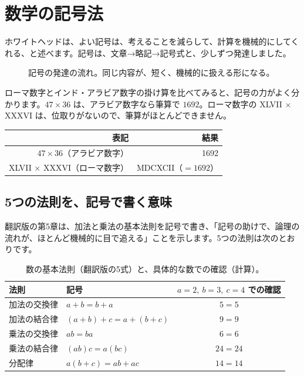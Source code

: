 \documentclass[a4paper,11pt,openany]{ltjsbook}
\begin{document}
\chapter{数学の記号法}

ホワイトヘッドは、よい記号は、考えることを減らして、計算を機械的にしてくれる、と述べます。記号は、文章→略記→記号式と、少しずつ発達しました。

\begin{figure}[htbp]
\centering
{}
\caption{記号の発達の流れ。同じ内容が、短く、機械的に扱える形になる。}
\end{figure}

ローマ数字とインド・アラビア数字の掛け算を比べてみると、記号の力がよく分かります。$47\times36$ は、アラビア数字なら筆算で $1692$。ローマ数字の XLVII $\times$ XXXVI は、位取りがないので、筆算がほとんどできません。

\begin{center}
\begin{tabular}{rr}
\toprule
表記 & 結果\\
\midrule
$47\times36$（アラビア数字） & 1692\\
XLVII $\times$ XXXVI（ローマ数字） & MDCXCII（$=1692$）\\
\bottomrule
\end{tabular}
\end{center}


\section{5つの法則を、記号で書く意味}

翻訳版の第5章は、加法と乗法の基本法則を記号で書き、「記号の助けで、論理の流れが、ほとんど機械的に目で追える」ことを示します。5つの法則は次のとおりです。

\begin{table}[htbp]
\centering
\begin{tabular}{llc}
\toprule
法則 & 記号 & $a=2,\ b=3,\ c=4$ での確認\\
\midrule
加法の交換律 & $a+b=b+a$ & $5=5$\\
加法の結合律 & $(a+b)+c=a+(b+c)$ & $9=9$\\
乗法の交換律 & $ab=ba$ & $6=6$\\
乗法の結合律 & $(ab)c=a(bc)$ & $24=24$\\
分配律 & $a(b+c)=ab+ac$ & $14=14$\\
\bottomrule
\end{tabular}
\caption{数の基本法則（翻訳版の5式）と、具体的な数での確認（計算）。}
\end{table}
\end{document}
